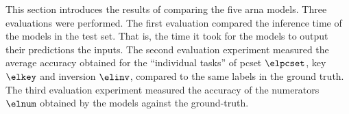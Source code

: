 
This section introduces the results of comparing the five
\gls{arna} models. Three evaluations were performed. The
first evaluation compared the inference time of the models
in the test set. That is, the time it took for the models to
output their predictions the inputs. The second evaluation
experiment measured the average accuracy obtained for the
``individual tasks'' of \gls{pcset} $\elpcset$, key $\elkey$
and inversion $\elinv$, compared to the same labels in the
ground truth. The third evaluation experiment measured the
accuracy of the numerators $\elnum$ obtained by the models
against the ground-truth. 

